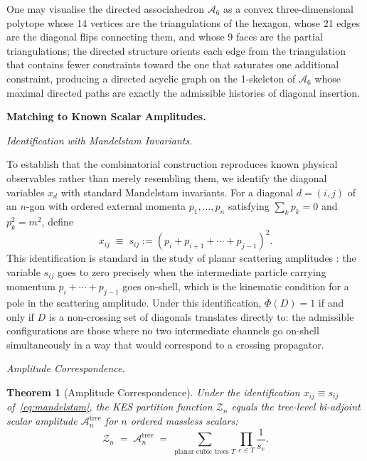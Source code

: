 \documentclass[11pt]{article}
\theoremstyle{plain}
\newtheorem{theorem}{Theorem}[section]
\theoremstyle{definition}
\theoremstyle{remark}
\newcommand{\Phif}{\Phi}
\begin{document}
One may visualise the directed associahedron $\mathcal{A}_6$ as a convex three-dimensional polytope whose 14 vertices are the triangulations of the hexagon, whose 21 edges are the diagonal flips connecting them, and whose 9 faces are the partial triangulations; the directed structure orients each edge from the triangulation that contains fewer constraints toward the one that saturates one additional constraint, producing a directed acyclic graph on the 1-skeleton of $\mathcal{A}_6$ whose maximal directed paths are exactly the admissible histories of diagonal insertion.

\bigskip\noindent\textbf{Matching to Known Scalar Amplitudes.}
\label{sec:matching}

\medskip\noindent\textit{Identification with Mandelstam Invariants.}

To establish that the combinatorial construction reproduces known physical
observables rather than merely resembling them, we identify the diagonal
variables $x_d$ with standard Mandelstam invariants. For a diagonal
$d = (i,j)$ of an $n$-gon with ordered external momenta
$p_1, \ldots, p_n$ satisfying $\sum_k p_k = 0$ and $p_k^2 = m^2$,
define
\begin{equation}
\label{eq:mandelstam}
  x_{ij} \;\equiv\; s_{ij} := (p_i + p_{i+1} + \cdots + p_{j-1})^2.
\end{equation}
This identification is standard in the study of planar scattering amplitudes
\cite{ABHY2018}: the variable $s_{ij}$ goes to zero precisely when the
intermediate particle carrying momentum $p_i + \cdots + p_{j-1}$ goes
on-shell, which is the kinematic condition for a pole in the scattering
amplitude. Under this identification, $\Phif(D) = 1$ if and only if $D$ is
a non-crossing set of diagonals translates directly to: the admissible
configurations are those where no two intermediate channels go on-shell
simultaneously in a way that would correspond to a crossing propagator.

\medskip\noindent\textit{Amplitude Correspondence.}

\begin{theorem}[Amplitude Correspondence]
\label{thm:amplitude}
Under the identification $x_{ij} \equiv s_{ij}$ of~\eqref{eq:mandelstam},
the KES partition function $\mathcal{Z}_n$ equals the
tree-level bi-adjoint scalar amplitude $\mathcal{A}_n^{\mathrm{tree}}$
for $n$ ordered massless scalars:
\[
  \mathcal{Z}_n \;=\; \mathcal{A}_n^{\mathrm{tree}}
  \;=\; \sum_{\text{planar cubic trees } T}
  \prod_{e \in T} \frac{1}{s_e}.
\]
\end{theorem}
\end{document}
